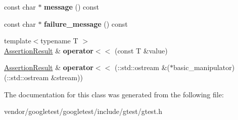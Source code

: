 \begin{DoxyCompactItemize}
\item 
const char $\ast$ {\bfseries message} () const \hypertarget{classtesting_1_1AssertionResult_ab20c91eba13e20f1b4ad89e3d15f69a8}{}\label{classtesting_1_1AssertionResult_ab20c91eba13e20f1b4ad89e3d15f69a8}

\item 
const char $\ast$ {\bfseries failure\+\_\+message} () const \hypertarget{classtesting_1_1AssertionResult_ae54fa82506c507a9dbc0f85d2cec652a}{}\label{classtesting_1_1AssertionResult_ae54fa82506c507a9dbc0f85d2cec652a}

\item 
{\footnotesize template$<$typename T $>$ }\\\hyperlink{classtesting_1_1AssertionResult}{Assertion\+Result} \& {\bfseries operator$<$$<$} (const T \&value)\hypertarget{classtesting_1_1AssertionResult_a3230efa81aafe7c61f5fb878cfa39e91}{}\label{classtesting_1_1AssertionResult_a3230efa81aafe7c61f5fb878cfa39e91}

\item 
\hyperlink{classtesting_1_1AssertionResult}{Assertion\+Result} \& {\bfseries operator$<$$<$} (\+::std\+::ostream \&($\ast$basic\+\_\+manipulator)(\+::std\+::ostream \&stream))\hypertarget{classtesting_1_1AssertionResult_a43ae8a260843ce2ff3dc9af262672b8b}{}\label{classtesting_1_1AssertionResult_a43ae8a260843ce2ff3dc9af262672b8b}

\end{DoxyCompactItemize}


The documentation for this class was generated from the following file\+:\begin{DoxyCompactItemize}
\item 
vendor/googletest/googletest/include/gtest/gtest.\+h\end{DoxyCompactItemize}
